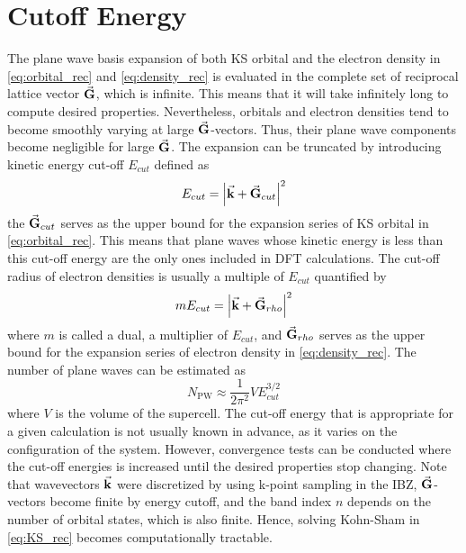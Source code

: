 \section{Cutoff Energy }
The plane wave basis expansion of both KS orbital and the electron density in \eqref{eq:orbital_rec} and \eqref{eq:density_rec} is evaluated in the complete set of reciprocal lattice vector $\va{G}$, which is infinite. This means that it will take infinitely long to compute desired properties. Nevertheless, orbitals and electron densities tend to become smoothly varying at large $\va{G}$-vectors. Thus, their plane wave components become negligible for large $\va{G}$. The expansion can be truncated by introducing kinetic energy cut-off $E_{cut}$ defined as
\begin{equation}
	E_{cut} = \abs{\va{k} + \va{G}_{cut}}^2
\end{equation}
the $\va{G}_{cut}$ serves as the upper bound for the expansion series of KS orbital in \eqref{eq:orbital_rec}. This means that plane waves whose kinetic energy is less than this cut-off energy are the only ones included in DFT calculations. The cut-off radius of electron densities is usually a multiple of $E_{cut}$ quantified by
\begin{equation}
	m E_{cut} = \abs{\va{k} + \va{G}_{rho}}^2
\end{equation}
where $m$ is called a dual, a multiplier of $E_{cut}$, and $\va{G}_{rho}$ serves as the upper bound for the expansion series of electron density in \eqref{eq:density_rec}. The number of plane waves can be estimated as
\begin{equation}
	N_{\text{PW}} \approx \frac{1}{2 \pi^2} V E_{cut}^{3/2}
\end{equation}
where $V$ is the volume of the supercell. The cut-off energy that is  appropriate for a given calculation is  not usually known in advance, as it varies on the configuration of the system. However, convergence tests can be conducted  where the cut-off energies is increased until the desired properties stop changing. Note that wavevectors $\va{k}$ were discretized by using k-point sampling in the IBZ, $\va{G}$-vectors become finite by energy cutoff,  and the band index $n$ depends on the number of orbital states, which is also finite. Hence, solving Kohn-Sham in \eqref{eq:KS_rec} becomes computationally tractable.

